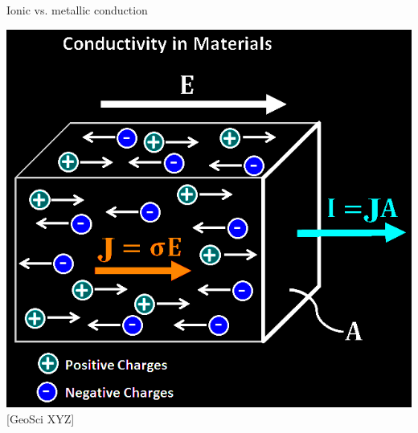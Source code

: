\begin{frame}
  \begin{PointSix}{Ionic vs. metallic conduction}
    \begin{center}
      \includegraphics[width=0.80\linewidth]{Figures/Resistivity/conductivity_physics_diagram_RGeoSciXYZ.png}
      \tiny[GeoSci XYZ]
    \end{center}
   
      
  \end{PointSix}
\end{frame}

